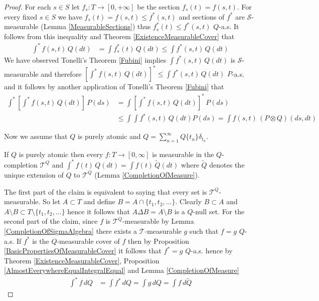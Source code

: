 \begin{proof}
For each $s \in S$ let $f_s : T \to [0,+\infty]$ be the section $f_s(t) = f(s,t)$.  For every fixed $s \in S$ we have $f_s(t) = f(s,t) \leq f^*(s,t)$ and sections of $f^*$ are $\mathcal{S}$-measurable (Lemma \ref{MeasurableSections}) thus $f_s^*(t) \leq f^*(s,t)$ $Q$-a.s.   It follows from this inequality and Theorem \ref{ExistenceMeasurableCover} that 
\begin{align*}
\int^* f(s,t) \, Q(dt) &= \int f^*_s(t) \, Q(dt) \leq \int f^*(s,t) \, Q(dt)
\end{align*}
We have observed Tonelli's Theorem \ref{Fubini} implies $\int f^*(s,t) \, Q(dt)$ is $\mathcal{S}$-measurable and therefore $\left [ \int^* f(s,t) \, Q(dt) \right]^* \leq \int f^*(s,t) \, Q(dt)$ $P$-a.s.  and it follows by another application of Tonelli's Theorem \ref{Fubini} that
\begin{align*}
\int^*\left [ \int^* f(s,t) \, Q(dt) \right] \, P(ds) &= \int \left [ \int^* f(s,t) \, Q(dt) \right]^* \, P(ds) \\
&\leq \int \int f^*(s,t) \, Q(dt) P(ds) = \int f(s,t) \, (P \otimes Q)(ds,dt)
\end{align*}

Now we assume that $Q$ is purely atomic and $Q = \sum_{n=1}^\infty Q \lbrace t_n \rbrace \delta_{t_n}$.

\begin{clm}If $Q$ is purely atomic then every $f : T \to [0,\infty]$ is measurable in the $Q$-completion $\mathcal{T}^Q$ and $\int^* f(t) \, Q(dt) = \int f(t) \, \tilde{Q}(dt)$ where $\tilde{Q}$ denotes the unique extension of $Q$ to $\mathcal{T}^Q$ (Lemma \ref{CompletionOfMeasure}).
\end{clm}
The first part of the claim is equivalent to saying that every set is $\mathcal{T}^Q$-measurable.  So let $A \subset T$ and define $B = A \cap \lbrace t_1, t_2, \dotsc \rbrace$.  Clearly $B \subset A$ and $A \setminus B \subset T \setminus \lbrace t_1, t_2, \dotsc \rbrace$ hence it follows that $A \Delta B = A \setminus B$ is a $Q$-null set.  For the second part of the claim,
since $f$ is $\mathcal{T}^Q$-measurable by Lemma \ref{CompletionOfSigmaAlgebra} there exists a $\mathcal{T}$-measurable $g$ such that $f=g$ $Q$-a.s.  If $f^*$ is the $Q$-measurable cover of $f$ then by Proposition \ref{BasicPropertiesOfMeasurableCover} it follows that $f^* = g$ $Q$-a.s.  hence by  Theorem \ref{ExistenceMeasurableCover}, Proposition \ref{AlmostEverywhereEqualIntegralEqual} and Lemma \ref{CompletionOfMeasure}
\begin{align*}
\int^* f \, dQ &= \int f^* \, dQ = \int g \, dQ = \int f \, d \tilde{Q}
\end{align*}


\end{proof}
